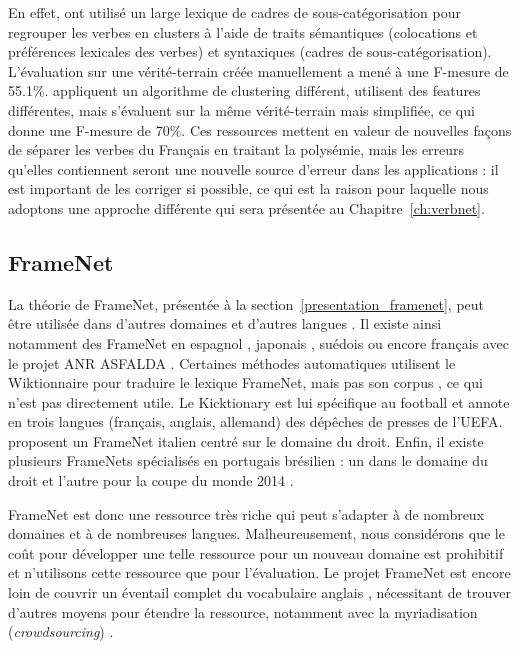 En effet, \cite{sun2010investigating} ont utilisé un large lexique de cadres de
sous-catégorisation \citep{messiant2010acquisition} pour regrouper les verbes
en clusters à l'aide de traits sémantiques (colocations et préférences
lexicales des verbes) et syntaxiques (cadres de sous-catégorisation).
L'évaluation sur une vérité-terrain créée manuellement a mené à une F-mesure de
55.1\%.  \cite{falk2012classifying} appliquent un algorithme de clustering
différent, utilisent des features différentes, mais s'évaluent sur la même
vérité-terrain mais simplifiée, ce qui donne une F-mesure de 70\%.  Ces
ressources mettent en valeur de nouvelles façons de séparer les verbes du
Français en traitant la polysémie, mais les erreurs qu'elles contiennent seront
une nouvelle source d'erreur dans les applications : il est important de les
corriger si possible, ce qui est la raison pour laquelle nous adoptons une
approche différente qui sera présentée au Chapitre~\ref{ch:verbnet}.

\subsection{FrameNet}
\label{traduction_framenet}

La théorie de FrameNet, présentée à la section~\ref{presentation_framenet},
peut être utilisée dans d'autres domaines et d'autres langues
\citep{boas2009multilingual}. Il existe ainsi notamment des FrameNet en
espagnol \citep{subirats2003surprise}, japonais \citep{ohara2004japanese},
suédois \citep{heppin2012rocky} ou encore français avec le projet ANR ASFALDA
\citep{candito2014developing}. Certaines méthodes automatiques utilisent le
Wiktionnaire pour traduire le lexique FrameNet, mais pas son corpus
\citep{mouton2010framenet,hartmann2013framenet}, ce qui n'est pas directement
utile. Le Kicktionary \citep{schmidt2009kicktionary} est lui spécifique au
football et annote en trois langues (français, anglais, allemand) des dépêches
de presses de l'UEFA.  \cite{venturi2009towards} proposent un FrameNet italien
centré sur le domaine du droit. Enfin, il existe plusieurs FrameNets
spécialisés en portugais brésilien : un dans le domaine du droit
\citep{bertoldi2012frame} et l'autre pour la coupe du monde 2014
\citep{torrent2014copa}.

FrameNet est donc une ressource très riche qui peut s'adapter à de nombreux
domaines et à de nombreuses langues. Malheureusement, nous considérons que le
coût pour développer une telle ressource pour un nouveau domaine est prohibitif
et n'utilisons cette ressource que pour l'évaluation. Le projet FrameNet est
encore loin de couvrir un éventail complet du vocabulaire anglais
\citep[section~5.4]{marquez2008semantic}, nécessitant de trouver d'autres moyens pour
étendre la ressource, notamment avec la myriadisation (\textit{crowdsourcing})
\citep{fossati2013outsourcing,baker2014framenet}.

